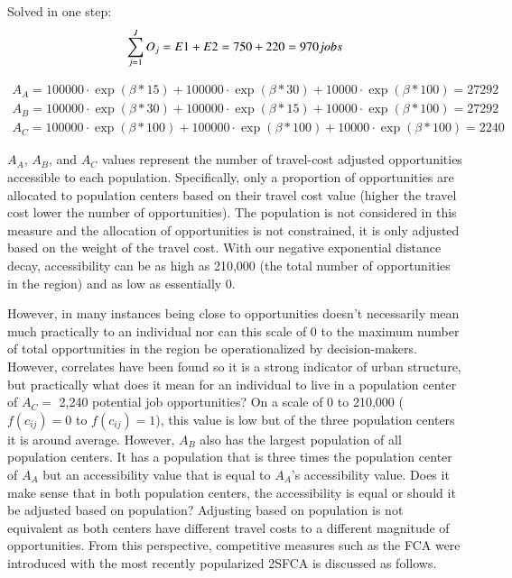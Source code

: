 \documentclass[]{elsarticle} %
\begin{document}
Solved in one step: \[
\sum_{j=1}^JO_j = E1 + E2 =  750 + 220 = 970 \space jobs
\]

\begin{equation}
\begin{array}{l}
A_{A} = 100000 \cdot \exp(\beta*15) + 100000 \cdot \exp(\beta*30) + 10000 \cdot \exp(\beta*100) = 27292 \\
A_{B} = 100000 \cdot \exp(\beta*30) + 100000 \cdot \exp(\beta*15) + 10000 \cdot \exp(\beta*100) = 27292 \\
A_{C} = 100000 \cdot \exp(\beta*100) + 100000 \cdot \exp(\beta*100) + 10000 \cdot \exp(\beta*100) = 2240
\end{array}
\end{equation}

\(A_{A}\), \(A_{B}\), and \(A_{C}\) values represent the number of
travel-cost adjusted opportunities accessible to each population.
Specifically, only a proportion of opportunities are allocated to
population centers based on their travel cost value (higher the travel
cost lower the number of opportunities). The population is not
considered in this measure and the allocation of opportunities is not
constrained, it is only adjusted based on the weight of the travel cost.
With our negative exponential distance decay, accessibility can be as
high as 210,000 (the total number of opportunities in the region) and as
low as essentially 0.

However, in many instances being close to opportunities doesn't
necessarily mean much practically to an individual nor can this scale of
0 to the maximum number of total opportunities in the region be
operationalized by decision-makers. However, correlates have been found
so it is a strong indicator of urban structure, but practically what
does it mean for an individual to live in a population center of
\(A_{C} =\) 2,240 potential job opportunities? On a scale of 0 to
210,000 (\(f(c_{ij})=0\) to \(f(c_{ij})=1\)), this value is low but of
the three population centers it is around average. However, \(A_{B}\)
also has the largest population of all population centers. It has a
population that is three times the population center of \(A_{A}\) but an
accessibility value that is equal to \(A_{A}\)'s accessibility value.
Does it make sense that in both population centers, the accessibility is
equal or should it be adjusted based on population? Adjusting based on
population is not equivalent as both centers have different travel costs
to a different magnitude of opportunities. From this perspective,
competitive measures such as the FCA were introduced with the most
recently popularized 2SFCA is discussed as follows.
\end{document}

